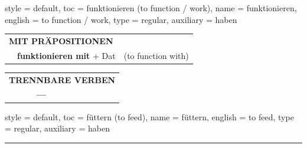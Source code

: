 \begin{verbentry}{
  style = {default},
  toc = {funktionieren (to function / work)},
  name = {funktionieren},
  english = {to function / work},
  type = {regular},
  auxiliary = {haben}
}
\vspace{10pt}

\begin{tabular}{lll}
\multicolumn{3}{l}{\textbf{MIT PRÄPOSITIONEN}}\\
& \textbf{funktionieren mit} + Dat & (to function with)\\
\end{tabular}
\hfill
\begin{tabular}{lll}
\multicolumn{3}{l}{\textbf{TRENNBARE VERBEN}}\\
& \textbf{---} & \\
\end{tabular}
\vspace{-5pt}
\end{verbentry}

\begin{verbentry}{
  style = {default},
  toc = {füttern (to feed)},
  name = {füttern},
  english = {to feed},
  type = {regular},
  auxiliary = {haben}
}
 
    
     \vspace{5pt}

    \hrule
    
    \vspace{5pt}


\end{verbentry}

